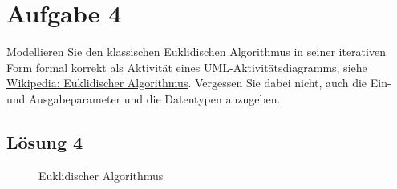 \documentclass[main.tex]{subfiles}
\begin{document}
\pagebreak

\section{Aufgabe 4}
Modellieren Sie den klassischen Euklidischen Algorithmus in seiner iterativen Form formal korrekt als Aktivität eines UML-Aktivitätsdiagramms, siehe
\href{https://de.wikipedia.org/wiki/Euklidischer_Algorithmus#Beschreibung_durch_Pseudocode}{Wikipedia: Euklidischer Algorithmus}.
Vergessen Sie dabei nicht, auch die Ein- und Ausgabeparameter und die Datentypen anzugeben.

\subsection{Lösung 4}

\begin{figure}[h!]
    \caption{Euklidischer Algorithmus}
    \label{fig:lgs4}
\end{figure}
\end{document}
